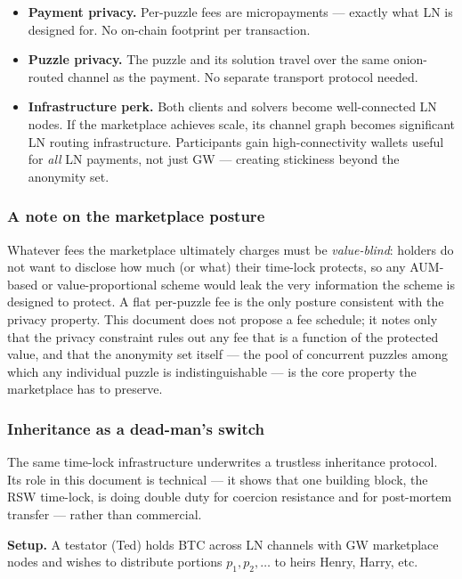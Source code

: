 \documentclass[a4paper,11pt]{article}
\begin{document}
\begin{itemize}[nosep,leftmargin=1.5em]
  \item \textbf{Payment privacy.} Per-puzzle fees are micropayments --- exactly what LN is designed for. No on-chain footprint per transaction.
  \item \textbf{Puzzle privacy.} The puzzle and its solution travel over the same onion-routed channel as the payment. No separate transport protocol needed.
  \item \textbf{Infrastructure perk.} Both clients and solvers become well-connected LN nodes. If the marketplace achieves scale, its channel graph becomes significant LN routing infrastructure. Participants gain high-connectivity wallets useful for \textit{all} LN payments, not just GW --- creating stickiness beyond the anonymity set.
\end{itemize}

\subsubsection{A note on the marketplace posture}

Whatever fees the marketplace ultimately charges must be \emph{value-blind}: holders do not want to disclose how much (or what) their time-lock protects, so any AUM-based or value-proportional scheme would leak the very information the scheme is designed to protect. A flat per-puzzle fee is the only posture consistent with the privacy property. This document does not propose a fee schedule; it notes only that the privacy constraint rules out any fee that is a function of the protected value, and that the anonymity set itself --- the pool of concurrent puzzles among which any individual puzzle is indistinguishable --- is the core property the marketplace has to preserve.

\subsubsection{Inheritance as a dead-man's switch}
\label{sec:inheritance}

The same time-lock infrastructure underwrites a trustless inheritance protocol. Its role in this document is technical --- it shows that one building block, the RSW time-lock, is doing double duty for coercion resistance and for post-mortem transfer --- rather than commercial.

\medskip
\noindent\textbf{Setup.} A testator (Ted) holds BTC across LN channels with GW marketplace nodes and wishes to distribute portions $p_1, p_2, \ldots$ to heirs Henry, Harry, etc.
\end{document}
